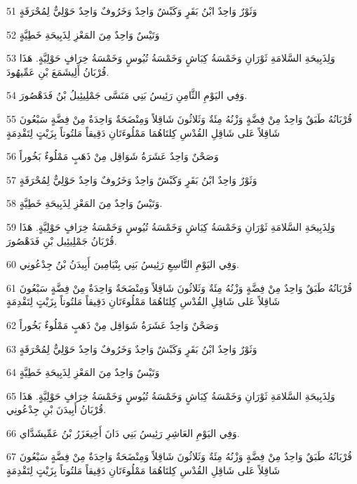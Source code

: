 \par 51 وَثَوْرٌ وَاحِدٌ ابْنُ بَقَرٍ وَكَبْشٌ وَاحِدٌ وَخَرُوفٌ وَاحِدٌ حَوْلِيٌّ لِمُحْرَقَةٍ
\par 52 وَتَيْسٌ وَاحِدٌ مِنَ المَعْزِ لِذَبِيحَةِ خَطِيَّةٍ
\par 53 وَلِذَبِيحَةِ السَّلامَةِ ثَوْرَانِ وَخَمْسَةُ كِبَاشٍ وَخَمْسَةُ تُيُوسٍ وَخَمْسَةُ خِرَافٍ حَوْلِيَّةٍ. هَذَا قُرْبَانُ أَلِيشَمَعَ بْنِ عَمِّيهُودَ.
\par 54 وَفِي اليَوْمِ الثَّامِنِ رَئِيسُ بَنِي مَنَسَّى جَمْلِيئِيلُ بْنُ فَدَهْصُورَ.
\par 55 قُرْبَانُهُ طَبَقٌ وَاحِدٌ مِنْ فِضَّةٍ وَزْنُهُ مِئَةٌ وَثَلاثُونَ شَاقِلاً وَمِنْضَحَةٌ وَاحِدَةٌ مِنْ فِضَّةٍ سَبْعُونَ شَاقِلاً عَلى شَاقِلِ القُدْسِ كِلتَاهُمَا مَمْلُوءَتَانِ دَقِيقاً مَلتُوتاً بِزَيْتٍ لِتَقْدِمَةٍ
\par 56 وَصَحْنٌ وَاحِدٌ عَشَرَةُ شَوَاقِل مِنْ ذَهَبٍ مَمْلُوءٌ بَخُوراً
\par 57 وَثَوْرٌ وَاحِدٌ ابْنُ بَقَرٍ وَكَبْشٌ وَاحِدٌ وَخَرُوفٌ وَاحِدٌ حَوْلِيٌّ لِمُحْرَقَةٍ
\par 58 وَتَيْسٌ وَاحِدٌ مِنَ المَعْزِ لِذَبِيحَةِ خَطِيَّةٍ.
\par 59 وَلِذَبِيحَةِ السَّلامَةِ ثَوْرَانِ وَخَمْسَةُ كِبَاشٍ وَخَمْسَةُ تُيُوسٍ وَخَمْسَةُ خِرَافٍ حَوْلِيَّةٍ. هَذَا قُرْبَانُ جَمْلِيئِيل بْنِ فَدَهْصُورَ.
\par 60 وَفِي اليَوْمِ التَّاسِعِ رَئِيسُ بَنِي بِنْيَامِينَ أَبِيدَنُ بْنُ جِدْعُونِي.
\par 61 قُرْبَانُهُ طَبَقٌ وَاحِدٌ مِنْ فِضَّةٍ وَزْنُهُ مِئَةٌ وَثَلاثُونَ شَاقِلاً وَمِنْضَحَةٌ وَاحِدَةٌ مِنْ فِضَّةٍ سَبْعُونَ شَاقِلاً عَلى شَاقِلِ القُدْسِ كِلتَاهُمَا مَمْلُوءَتَانِ دَقِيقاً مَلتُوتاً بِزَيْتٍ لِتَقْدِمَةٍ
\par 62 وَصَحْنٌ وَاحِدٌ عَشَرَةُ شَوَاقِل مِنْ ذَهَبٍ مَمْلُوءٌ بَخُوراً
\par 63 وَثَوْرٌ وَاحِدٌ ابْنُ بَقَرٍ وَكَبْشٌ وَاحِدٌ وَخَرُوفٌ وَاحِدٌ حَوْلِيٌّ لِمُحْرَقَةٍ
\par 64 وَتَيْسٌ وَاحِدٌ مِنَ المَعْزِ لِذَبِيحَةِ خَطِيَّةٍ
\par 65 وَلِذَبِيحَةِ السَّلامَةِ ثَوْرَانِ وَخَمْسَةُ كِبَاشٍ وَخَمْسَةُ تُيُوسٍ وَخَمْسَةُ خِرَافٍ حَوْلِيَّةٍ. هَذَا قُرْبَانُ أَبِيدَنَ بْنِ جِدْعُونِي.
\par 66 وَفِي اليَوْمِ العَاشِرِ رَئِيسُ بَنِي دَانَ أَخِيعَزَرُ بْنُ عَمِّيشَدَّاي.
\par 67 قُرْبَانُهُ طَبَقٌ وَاحِدٌ مِنْ فِضَّةٍ وَزْنُهُ مِئَةٌ وَثَلاثُونَ شَاقِلاً وَمِنْضَحَةٌ وَاحِدَةٌ مِنْ فِضَّةٍ سَبْعُونَ شَاقِلاً عَلى شَاقِلِ القُدْسِ كِلتَاهُمَا مَمْلُوءَتَانِ دَقِيقاً مَلتُوتاً بِزَيْتٍ لِتَقْدِمَةٍ
